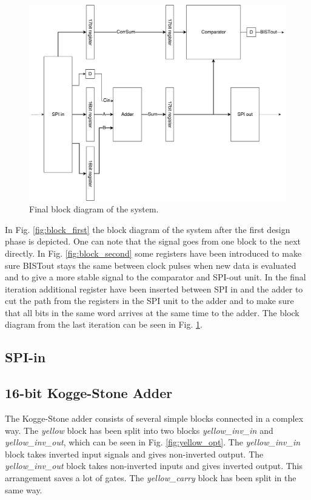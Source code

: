 \begin{figure}[H]
\centering
\captionsetup{justification=centering}
\includegraphics[scale=0.1]{../figures/top_level_final.png}
\caption{Final block diagram of the system.}  \label{fig:block_final}
\end{figure}

In Fig. \ref{fig:block_first} the block diagram of the system after the first design phase is depicted. One can note that the signal goes from one block to the next directly. In Fig. \ref{fig:block_second} some registers have been introduced to make sure BISTout stays the same between clock pulses when new data is evaluated and to give a more stable signal to the comparator and SPI-out unit. In the final iteration additional register have been inserted between SPI in and the adder to cut the path from the registers in the SPI unit to the adder and to make sure that all bits in the same word arrives at the same time to the adder. The block diagram from the last iteration can be seen in Fig. \ref{fig:block_final}.

\subsection{SPI-in}

\subsection{16-bit Kogge-Stone Adder}
The Kogge-Stone adder consists of several simple blocks connected in a complex way. The \textit{yellow} block has been split into two blocks \textit{yellow\_inv\_in} and \textit{yellow\_inv\_out}, which can be seen in Fig. \ref{fig:yellow_opt}. The \textit{yellow\_inv\_in} block takes inverted input signals and gives non-inverted output. The \textit{yellow\_inv\_out} block takes non-inverted inputs and gives inverted output. This arrangement saves a lot of gates. The \textit{yellow\_carry} block has been split in the same way. 

